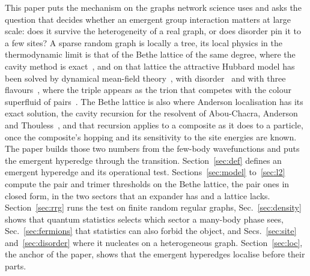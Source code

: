 \documentclass[aps,pre,twocolumn,superscriptaddress,floatfix]{revtex4-2}
\begin{document}
This paper puts the mechanism on the graphs network science uses and
asks the question that decides whether an emergent group interaction
matters at large scale: does it survive the heterogeneity of a real
graph, or does disorder pin it to a few sites? A sparse random graph is
locally a tree, its local physics in the thermodynamic limit is that of
the Bethe lattice of the same degree, where the cavity method is exact~\cite{abouchacra1973,vazquez2023pre,chybook}, and on that lattice the attractive Hubbard model has been solved by dynamical mean-field
theory~\cite{keller2001,garg2005,toschi2005}, with
disorder~\cite{ioffe2010,feigelman2010} and with three
flavours~\cite{inaba2009,inaba2011}, where the triple appears as the
trion that competes with the colour superfluid of
pairs~\cite{rapp2007,inaba2009,inaba2011}. The Bethe lattice is also
where Anderson localisation has its exact solution, the cavity
recursion for the resolvent of Abou-Chacra, Anderson and
Thouless~\cite{abouchacra1973}, and that recursion applies to a
composite as it does to a particle, once the composite's hopping and its
sensitivity to the site energies are known. The paper builds those two
numbers from the few-body wavefunctions and puts the emergent hyperedge
through the transition. Section~\ref{sec:def} defines an emergent
hyperedge and its operational test. Sections~\ref{sec:model}
to~\ref{sec:l2} compute the pair and trimer thresholds on the Bethe
lattice, the pair ones in closed form, in the two sectors that an
expander has and a lattice lacks. Section~\ref{sec:rrg} runs the test on
finite random regular graphs, Sec.~\ref{sec:density} shows that quantum
statistics selects which sector a many-body phase sees,
Sec.~\ref{sec:fermions} that statistics can also forbid the object, and
Secs.~\ref{sec:site} and~\ref{sec:disorder} where it nucleates on a
heterogeneous graph. Section~\ref{sec:loc}, the anchor of the paper, shows that the emergent
hyperedges localise before their parts.
\end{document}
